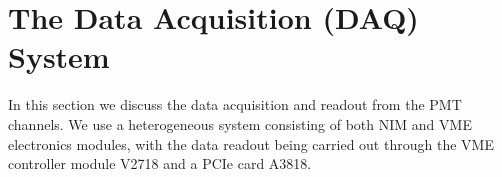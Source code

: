 \section{The Data Acquisition (DAQ) System }
\label{sec:DAQ}


 In this section we discuss the data acquisition and readout from the PMT 
channels. We use a heterogeneous system consisting of both 
NIM and VME electronics modules, with the data readout being carried out through the VME controller module V2718 and a PCIe card A3818. 

